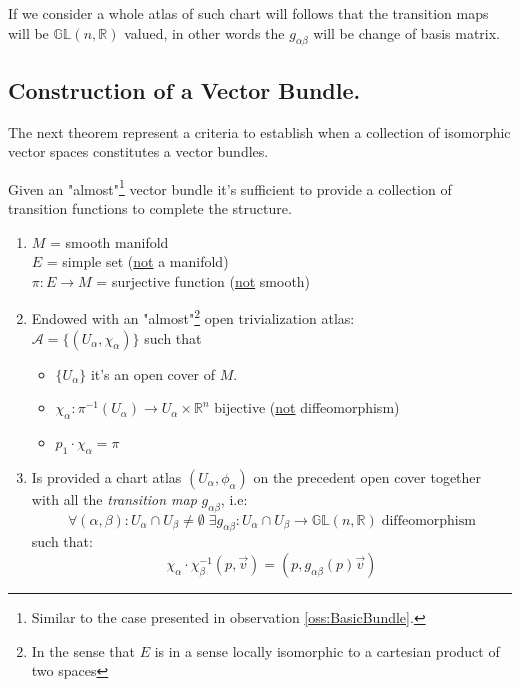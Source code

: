 \documentclass[a4paper,12pt]{scrartcl}    %
\begin{document}
\begin{observation}
If we consider a whole atlas of such chart will follows that the transition maps will be $\mathbb{GL}(n, \mathbb{R})$ valued, in other words the $g_{\alpha \beta}$ will be change of basis matrix.
\end{observation}

\subsection{Construction of a Vector Bundle.}
The next theorem represent a criteria to establish when a collection of isomorphic vector spaces constitutes a vector bundles.
\begin{theorem}\label{Teo: Reconstruction Vector Bundle 1}
Given an "almost"\footnote{Similar to the case presented in observation \ref{oss:BasicBundle}.} vector bundle it's sufficient to provide a collection of transition functions to complete the structure.
	\begin{hypothesis}
			\begin{enumerate}
				\item $M$ = smooth manifold
					\\ $E$ = simple set (\underline{not} a manifold)
					\\ $\pi: E \rightarrow M$ = surjective function (\underline{not} smooth)
				\item Endowed with an "almost"\footnote{In the sense that $E$ is in a sense locally isomorphic to a cartesian product of two spaces} open trivialization atlas:
					\\ $\mathcal{A}= \big\{ (U_{\alpha}, \chi_{\alpha}) \big \}$ such that
						\begin{itemize}
						\item $\{ U_{\alpha} \}$ it's an open cover of $M$.
						\item $\chi_{\alpha} : \pi^{-1}(U_{\alpha}) \rightarrow U_{\alpha} \times \mathbb{R}^n$ bijective (\underline{not} diffeomorphism)
						\item  $p_1 \cdot \chi_{\alpha} = \pi$
						\end{itemize}
				\item Is provided a chart atlas $(U_{\alpha}, \phi_{\alpha})$ on the precedent open cover together with all the \emph{transition map} $g_{\alpha \beta}$, i.e:
				\begin{displaymath}
				\forall (\alpha, \beta) : U_{\alpha} \cap U_{\beta} \neq \emptyset \; \exists g_{\alpha \beta} : U_{\alpha} \cap U_{\beta} \rightarrow \mathbb{GL}(n, \mathbb{R}) \; \textrm{diffeomorphism}
				\end{displaymath}
				such that:
				\begin{displaymath}
					\chi_{\alpha} \cdot \chi_{\beta}^{-1} (p , \vec{v}) = ( p, g_{\alpha \beta}(p) \vec{v} ) 	
				\end{displaymath}					
			\end{enumerate}
	\end{hypothesis}
	

\end{theorem}
\end{document}
